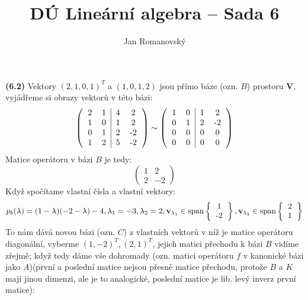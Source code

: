 \documentclass{article}
\title{DÚ Lineární algebra -- Sada 6}
\author{Jan Romanovský}
\begin{document}
\maketitle

\textbf{(6.2)}
    Vektory $(2, 1, 0, 1)^T$ a $(1,0,1,2)$ jsou přímo báze (ozn. $B$) prostoru $\textbf{V}$, vyjádřeme si obrazy vektorů v této bázi:
    $$\left(\begin{tabular}{ c c | c c }
        2 & 1 & 4 & 2\\
        1 & 0 & 1 & 2\\
        0 & 1 & 2 & -2\\
        1 & 2 & 5 & -2
    \end{tabular}\right)\sim
    \left(\begin{tabular}{ c c | c c }
        1 & 0 & 1 & 2\\
        0 & 1 & 2 & -2\\
        0 & 0 & 0 & 0 \\
        0 & 0 & 0 & 0
    \end{tabular}\right)$$
    Matice operátoru v bázi $B$ je tedy:
    $$\begin{pmatrix}
        1 & 2 \\
        2 & -2
    \end{pmatrix}$$
    Když spočítame vlastní čísla a vlastní vektory:
    $$p_b(\lambda) = (1-\lambda)(-2-\lambda)-4, \lambda_1 = -3, \lambda_2 = 2, \textbf{v}_{\lambda_1} \in \text{span}\left\{\begin{tabular}{c}1 \\ -2  \end{tabular}\right\}, \textbf{v}_{\lambda_2} \in \text{span}\left\{\begin{tabular}{c} 2 \\ 1 \end{tabular}\right\}$$
        To nám dává novou bázi (ozn. $C$) z vlastních vektorů v níž je matice operátoru diagonální, vyberme $(1, -2)^T, (2, 1)^T$, jejich matici přechodu k bázi $B$ vidíme zřejmě; když tedy dáme vše dohromady (ozn. matici operátoru $f$ v kanonické bázi jako $A$)(první a poslední matice nejsou přesně matice přechodu, protože $B$ a $K$ mají jinou dimenzi, ale je to analogické, poslední matice je lib. levý inverz první matice):
\end{document}
